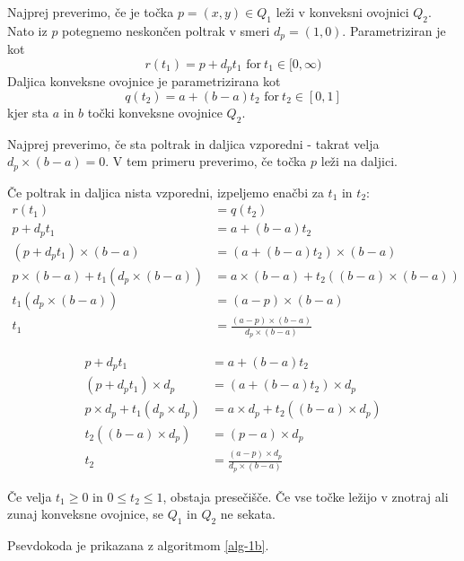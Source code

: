 \documentclass{article}
\begin{document}
Najprej preverimo, če je točka $p = (x, y) \in Q_1$ leži v konveksni ovojnici
$Q_2$. Nato iz $p$ potegnemo neskončen poltrak v smeri $d_p = (1, 0)$.
Parametriziran je kot
\begin{equation*}
	r(t_1) = p + d_p t_1 \text{  for}\ t_1 \in [0, \infty)
\end{equation*}
Daljica konveksne ovojnice je parametrizirana kot
\begin{equation*}
	q(t_2) = a + (b - a) t_2 \text{ for}\ t_2 \in [0, 1]
\end{equation*}
kjer sta $a$ in $b$ točki konveksne ovojnice $Q_2$.

Najprej preverimo, če sta poltrak in daljica vzporedni - takrat velja $d_p \times
(b - a) = 0$. V tem primeru preverimo, če točka $p$ leži na daljici.

Če poltrak in daljica nista vzporedni, izpeljemo enačbi za $t_1$ in $t_2$:
\begin{align*}
	r(t_1) &= q(t_2) \\
	p + d_p t_1 &= a + (b - a) t_2 \\
	(p + d_p t_1) \times (b - a) &= (a + (b - a) t_2) \times (b - a) \\
	p \times (b - a) + t_1 (d_p \times (b - a)) &= a \times (b - a) + t_2 ((b - a) \times (b - a)) \\
	t_1 (d_p \times (b - a)) &= (a - p) \times (b - a) \\
	t_1 &= \frac{(a - p) \times (b - a)}{d_p \times (b - a)}
\end{align*}

\begin{align*}
	p + d_p t_1 &= a + (b - a) t_2 \\
	(p + d_p t_1) \times d_p &= (a + (b - a) t_2) \times d_p \\
	p \times d_p + t_1 (d_p \times d_p) &= a \times d_p + t_2 ((b - a) \times d_p) \\
	t_2 ((b - a) \times d_p) &= (p - a) \times d_p \\
	t_2 &= \frac{(a - p) \times d_p}{d_p \times (b - a)}
\end{align*}

Če velja $t_1 \geq 0$ in $0 \leq t_2 \leq 1$, obstaja presečišče. Če vse točke
ležijo v znotraj ali zunaj konveksne ovojnice, se $Q_1$ in $Q_2$ ne sekata.

Psevdokoda je prikazana z algoritmom \ref{alg-1b}.
\end{document}
